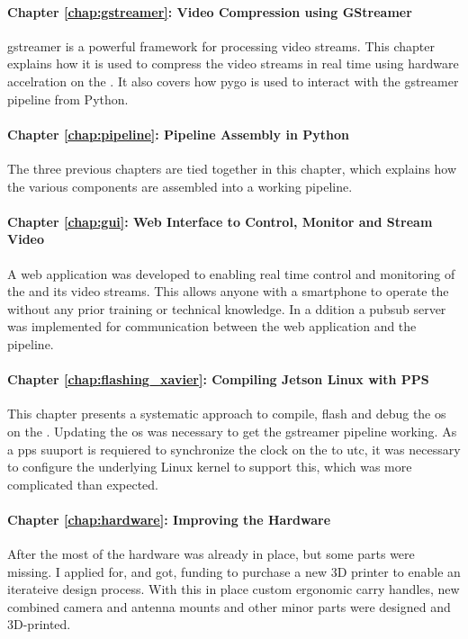 \paragraph{Chapter \ref{chap:gstreamer}: Video Compression using GStreamer}
\gls{gstreamer} is a powerful framework for processing video streams.
This chapter explains how it is used to compress the video streams in real time using hardware accelration on the \jx.
It also covers how \gls{pygo} is used to interact with the \gls{gstreamer} pipeline from Python.

\paragraph{Chapter \ref{chap:pipeline}: Pipeline Assembly in Python}
The three previous chapters are tied together in this chapter, which explains how the various components are assembled into a working pipeline.

\paragraph{Chapter \ref{chap:gui}: Web Interface to Control, Monitor and Stream Video}
A web application was developed to enabling real time control and monitoring of the \sr and its video streams.
This allows anyone with a smartphone to operate the \sr without any prior training or technical knowledge.
In a ddition a \gls{pubsub} server was implemented for communication between the web application and the pipeline.

\paragraph{Chapter \ref{chap:flashing_xavier}: Compiling Jetson Linux with PPS}
This chapter presents a systematic approach to compile, flash and debug the \gls{os} on the \jx.
Updating the \gls{os} was necessary to get the \gls{gstreamer} pipeline working.
As a \gls{pps} suuport is requiered  to synchronize the clock on the \jx to \gls{utc}, it was necessary to configure the underlying Linux kernel to support this, which was more complicated than expected.

\paragraph{Chapter \ref{chap:hardware}: Improving the Hardware}
After the \preproject most of the hardware was already in place, but some parts were missing.
I applied for, and got, funding to purchase a new 3D printer to enable an iterateive design process.
With this in place custom ergonomic carry handles, new combined camera and antenna mounts and other minor parts were designed and 3D-printed.

